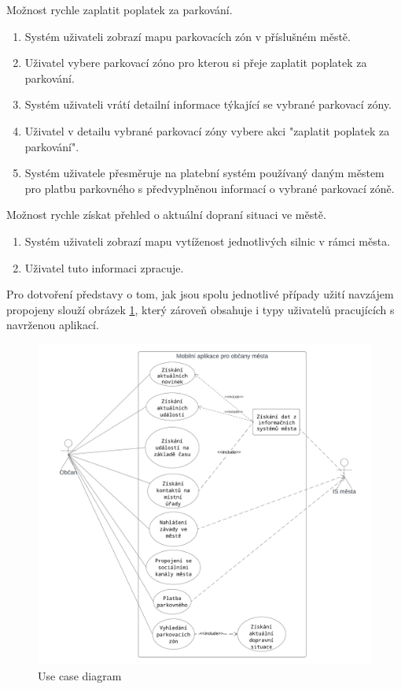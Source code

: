 Možnost rychle zaplatit poplatek za parkování.

\begin{enumerate}
  \item Systém uživateli zobrazí mapu parkovacích zón v příslušném městě.
  \item Uživatel vybere parkovací zóno pro kterou si přeje zaplatit poplatek za parkování.
  \item Systém uživateli vrátí detailní informace týkající se vybrané parkovací zóny.
  \item Uživatel v detailu vybrané parkovací zóny vybere akci "zaplatit poplatek za parkování".
  \item Systém uživatele přesměruje na platební systém používaný daným městem pro platbu parkovného s předvyplněnou informací o vybrané parkovací zóně.
\end{enumerate}

Možnost rychle získat přehled o aktuální dopraní situaci ve městě.
\begin{enumerate}
  \item Systém uživateli zobrazí mapu vytíženost jednotlivých silnic v rámci města.
  \item Uživatel tuto informaci zpracuje.
\end{enumerate}

Pro dotvoření představy o tom, jak jsou spolu jednotlivé případy užití navzájem propojeny slouží obrázek \ref{fig:use_case_diagram}, který zároveň 
obsahuje i typy uživatelů pracujících s navrženou aplikací.


\begin{figure}[H]
  \centering
  \includegraphics[width=.99\textwidth]{Use case diagram.png}
  \caption{Use case diagram}
  \label{fig:use_case_diagram}
\end{figure}

